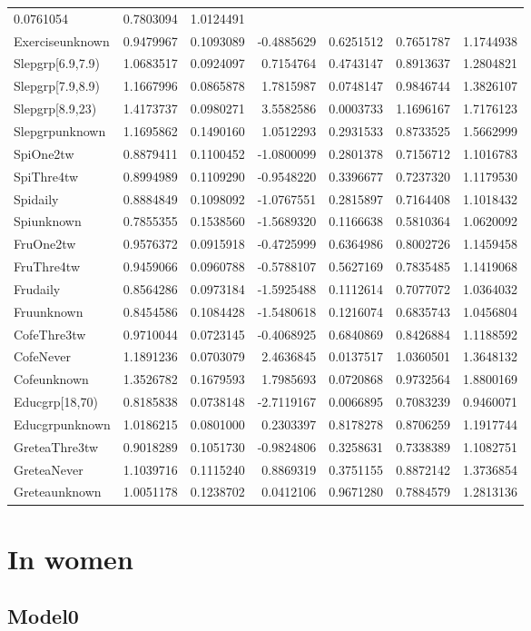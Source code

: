 \documentclass[]{article}
\begin{document}
\begin{longtable}[]{@{}lrrrrrr@{}}
0.0761054 & 0.7803094 & 1.0124491\tabularnewline
Exerciseunknown & 0.9479967 & 0.1093089 & -0.4885629 & 0.6251512 &
0.7651787 & 1.1744938\tabularnewline
Slepgrp{[}6.9,7.9) & 1.0683517 & 0.0924097 & 0.7154764 & 0.4743147 &
0.8913637 & 1.2804821\tabularnewline
Slepgrp{[}7.9,8.9) & 1.1667996 & 0.0865878 & 1.7815987 & 0.0748147 &
0.9846744 & 1.3826107\tabularnewline
Slepgrp{[}8.9,23) & 1.4173737 & 0.0980271 & 3.5582586 & 0.0003733 &
1.1696167 & 1.7176123\tabularnewline
Slepgrpunknown & 1.1695862 & 0.1490160 & 1.0512293 & 0.2931533 &
0.8733525 & 1.5662999\tabularnewline
SpiOne2tw & 0.8879411 & 0.1100452 & -1.0800099 & 0.2801378 & 0.7156712 &
1.1016783\tabularnewline
SpiThre4tw & 0.8994989 & 0.1109290 & -0.9548220 & 0.3396677 & 0.7237320
& 1.1179530\tabularnewline
Spidaily & 0.8884849 & 0.1098092 & -1.0767551 & 0.2815897 & 0.7164408 &
1.1018432\tabularnewline
Spiunknown & 0.7855355 & 0.1538560 & -1.5689320 & 0.1166638 & 0.5810364
& 1.0620092\tabularnewline
FruOne2tw & 0.9576372 & 0.0915918 & -0.4725999 & 0.6364986 & 0.8002726 &
1.1459458\tabularnewline
FruThre4tw & 0.9459066 & 0.0960788 & -0.5788107 & 0.5627169 & 0.7835485
& 1.1419068\tabularnewline
Frudaily & 0.8564286 & 0.0973184 & -1.5925488 & 0.1112614 & 0.7077072 &
1.0364032\tabularnewline
Fruunknown & 0.8454586 & 0.1084428 & -1.5480618 & 0.1216074 & 0.6835743
& 1.0456804\tabularnewline
CofeThre3tw & 0.9710044 & 0.0723145 & -0.4068925 & 0.6840869 & 0.8426884
& 1.1188592\tabularnewline
CofeNever & 1.1891236 & 0.0703079 & 2.4636845 & 0.0137517 & 1.0360501 &
1.3648132\tabularnewline
Cofeunknown & 1.3526782 & 0.1679593 & 1.7985693 & 0.0720868 & 0.9732564
& 1.8800169\tabularnewline
Educgrp{[}18,70) & 0.8185838 & 0.0738148 & -2.7119167 & 0.0066895 &
0.7083239 & 0.9460071\tabularnewline
Educgrpunknown & 1.0186215 & 0.0801000 & 0.2303397 & 0.8178278 &
0.8706259 & 1.1917744\tabularnewline
GreteaThre3tw & 0.9018289 & 0.1051730 & -0.9824806 & 0.3258631 &
0.7338389 & 1.1082751\tabularnewline
GreteaNever & 1.1039716 & 0.1115240 & 0.8869319 & 0.3751155 & 0.8872142
& 1.3736854\tabularnewline
Greteaunknown & 1.0051178 & 0.1238702 & 0.0412106 & 0.9671280 &
0.7884579 & 1.2813136\tabularnewline
\bottomrule
\end{longtable}

\hypertarget{in-women}{%
\section{In women}\label{in-women}}

\hypertarget{model0-1}{%
\subsection{Model0}\label{model0-1}}
\end{document}

